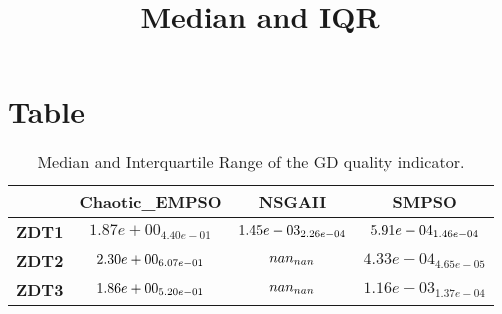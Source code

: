 \documentclass{article}
\title{Median and IQR}
\author{}
\begin{document}
\maketitle
\section{Table}
\begin{table}[!htp]
  \caption{Median and Interquartile Range of the GD quality indicator.}
  \label{table:GD}
  \centering
  \begin{scriptsize}
  \begin{tabular}{c|ccc}
      & \textbf{Chaotic\_EMPSO} & \textbf{NSGAII} & \textbf{SMPSO} \\\hline
      \textbf{ZDT1} & $1.87e+00_{4.40e-01} $ & $ \cellcolor{gray25} 1.45e-03_{2.26e-04} $ & $ \cellcolor{gray95} 5.91e-04_{1.46e-04}$ \\
      \textbf{ZDT2} & $\cellcolor{gray95} 2.30e+00_{6.07e-01} $ & $ \cellcolor{gray25} nan_{nan} $ & $ 4.33e-04_{4.65e-05}$ \\
      \textbf{ZDT3} & $\cellcolor{gray95} 1.86e+00_{5.20e-01} $ & $ \cellcolor{gray25} nan_{nan} $ & $ 1.16e-03_{1.37e-04}$ \\
  \end{tabular}
  \end{scriptsize}
\end{table}
\end{document}
